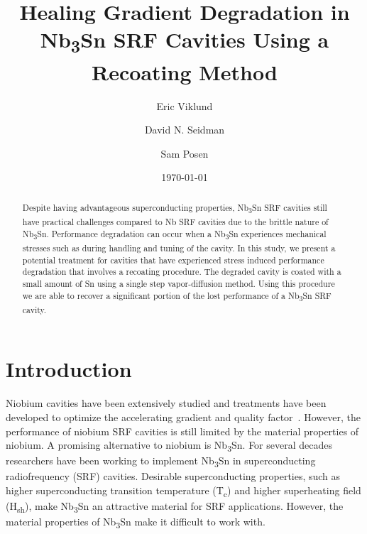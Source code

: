 \documentclass{revtex4-2}
\begin{document}
\title{Healing Gradient Degradation in Nb\textsubscript{3}Sn SRF Cavities Using a Recoating Method}
\author{Eric Viklund}
\author{David N. Seidman}
\author{Sam Posen}


\date{\today}

\begin{abstract}

    Despite having advantageous superconducting properties, Nb\textsubscript{3}Sn SRF cavities still have practical challenges compared to Nb SRF cavities due to the brittle nature of Nb\textsubscript{3}Sn. Performance degradation can occur when a Nb\textsubscript{3}Sn experiences mechanical stresses such as during handling and tuning of the cavity. In this study, we present a potential treatment for cavities that have experienced stress induced performance degradation that involves a recoating procedure. The degraded cavity is coated with a small amount of Sn using a single step vapor-diffusion method. Using this procedure we are able to recover a significant portion of the lost performance of a Nb\textsubscript{3}Sn SRF cavity.

\end{abstract}

\maketitle

\section{Introduction}
\label{sec:Introduction}

Niobium cavities have been extensively studied and treatments have been developed to optimize the accelerating gradient and quality factor~\cite{10.1063/1.4866013, 10.1063/1.4960801, 10.1063/5.0059464, 10.1063/5.0063379}. However, the performance of niobium SRF cavities is still limited by the material properties of niobium. A promising alternative to niobium is Nb\textsubscript{3}Sn. For several decades researchers have been working to implement Nb\textsubscript{3}Sn in superconducting radiofrequency (SRF) cavities.\cite{10.1063/1.4913617, 10.1063/1.4913247} Desirable superconducting properties, such as higher superconducting transition temperature (T\textsubscript{c}) and higher superheating field (H\textsubscript{sh})\cite{liarte2017theoretical, catelani2008temperature, lin2012effect, kubo2020superfluid}, make Nb\textsubscript{3}Sn an attractive material for SRF applications. However, the material properties of Nb\textsubscript{3}Sn make it difficult to work with. 
\end{document}
